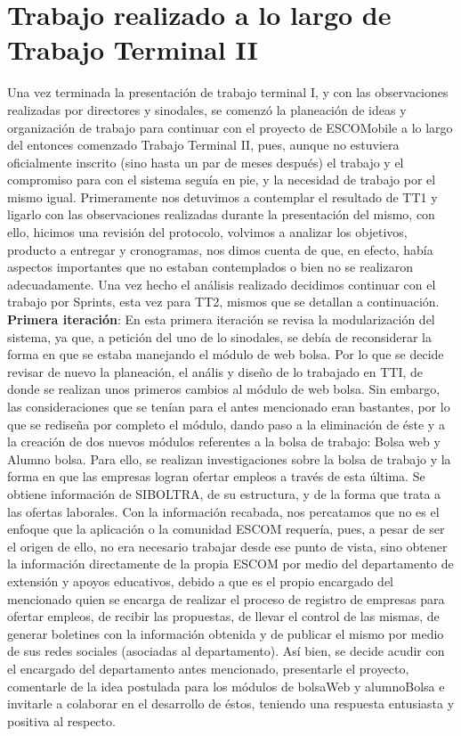 \section{Trabajo realizado a lo largo de Trabajo Terminal II}

\noindent
Una vez terminada la presentación de trabajo terminal I, y con las observaciones realizadas por directores y sinodales, se comenzó la planeación de ideas y organización de trabajo para continuar con el proyecto de ESCOMobile a lo largo del entonces comenzado Trabajo Terminal II, pues, aunque no estuviera oficialmente inscrito (sino hasta un par de meses después) el trabajo y el compromiso para con el sistema seguía en pie, y la necesidad de trabajo por el mismo igual.  
\newline
Primeramente nos detuvimos a contemplar el resultado de TT1 y ligarlo con las observaciones realizadas durante la presentación del mismo, con ello, hicimos una revisión del protocolo, volvimos a analizar los objetivos, producto a entregar y cronogramas, nos dimos cuenta de que, en efecto, había aspectos importantes que no estaban contemplados o bien no se realizaron adecuadamente. Una vez hecho el análisis realizado decidimos continuar con el trabajo por Sprints, esta vez para TT2, mismos que se detallan a continuación. 
\newline
\newline
\textbf{Primera iteración}: En esta primera iteración se revisa la modularización del sistema, ya que, a petición del uno de lo sinodales, se debía de reconsiderar la forma en que se estaba manejando el módulo de web bolsa. Por lo que se decide revisar de nuevo la planeación, el anális y diseño de lo trabajado en TTI, de donde se realizan unos primeros cambios al módulo de web bolsa. Sin embargo, las consideraciones que se tenían para el antes mencionado eran bastantes, por lo que se rediseña por completo el módulo, dando paso a la eliminación de éste y a la creación de dos nuevos módulos referentes a la bolsa de trabajo: Bolsa web y Alumno bolsa. 
\newline
\newline
Para ello, se realizan investigaciones sobre la bolsa de trabajo y la forma en que las empresas logran ofertar empleos a través de esta última. Se obtiene información de SIBOLTRA, de su estructura, y de la forma que trata a las ofertas laborales. Con la información recabada, nos percatamos que no es el enfoque que la aplicación o la comunidad ESCOM requería, pues, a pesar de ser el origen de ello, no era necesario trabajar desde ese punto de vista, sino obtener la información directamente de la propia ESCOM por medio del departamento de extensión y apoyos educativos, debido a que es el propio encargado del mencionado quien se encarga de realizar el proceso de registro de empresas para ofertar empleos, de recibir las propuestas, de llevar el control de las mismas, de generar boletines con la información obtenida y de publicar el mismo por medio de sus redes sociales (asociadas al departamento). Así bien, se decide acudir con el encargado del departamento antes mencionado, presentarle el proyecto, comentarle de la idea postulada para los módulos de bolsaWeb y alumnoBolsa e invitarle a colaborar en el desarrollo de éstos, teniendo una respuesta entusiasta y positiva al respecto. 

